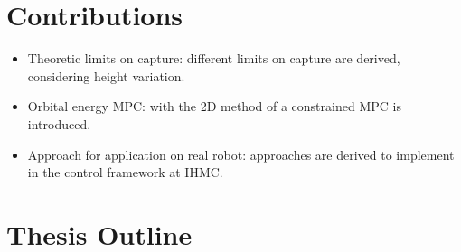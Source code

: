 \section{Contributions}
\begin{itemize}
	\item Theoretic limits on capture: different limits on capture are derived, considering height variation.
	\item Orbital energy \ac{MPC}: with the \ac{2D} method of \cite{koolen2016balance} a constrained \ac{MPC} is introduced.
	\item Approach for application on real robot: approaches are derived to implement in the control framework at IHMC.
\end{itemize}
\section{Thesis Outline}


